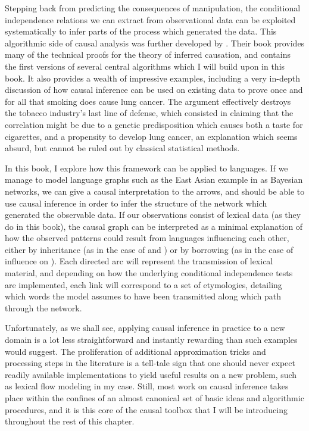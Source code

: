 Stepping back from predicting the consequences of manipulation, the conditional independence relations we can extract from observational data can be exploited systematically to infer parts of the process which generated the data. This algorithmic side of causal analysis was further developed by \cite{spirtes_ea_2000}. Their book provides many of the technical proofs for the theory of inferred causation, and contains the first versions of several central algorithms which I will build upon in this book. It also provides a wealth of impressive examples, including a very in-depth discussion of how causal inference can be used on existing data to prove once and for all that smoking does cause lung cancer. The argument effectively destroys the tobacco industry's last line of defense, which consisted in claiming that the correlation might be due to a genetic predisposition which causes both a taste for cigarettes, and a propensity to develop lung cancer, an explanation which seems absurd, but cannot be ruled out by 
classical statistical methods.

In this book, I explore how this framework can be applied to languages. If we manage to model language graphs such as the East Asian example in  as Bayesian networks, we can give a causal interpretation to the arrows, and should be able to use causal inference in order to infer the structure of the network which generated the observable data. If our observations consist of lexical data (as they do in this book), the causal graph can be interpreted as a minimal explanation of how the observed patterns could result from languages influencing each other, either by inheritance (as in the case of  and ) or by borrowing (as in the case of  influence on ). Each directed arc will represent the transmission of lexical material, and depending on how the underlying conditional independence tests are implemented, each link will correspond to a set of etymologies, detailing which words the model assumes to have been transmitted  along which path through the network.

Unfortunately, as we shall see, applying causal inference in practice to a new domain is a lot less straightforward and instantly rewarding than such examples would suggest. The proliferation of additional approximation tricks and processing steps in the literature is a tell-tale sign that one should never expect readily available implementations to yield useful results on a new problem, such as lexical flow modeling in my case. Still, most work on causal inference takes place within the confines of an almost canonical set of basic ideas and algorithmic procedures, and it is this core of the causal toolbox that I will be introducing throughout the rest of this chapter.

